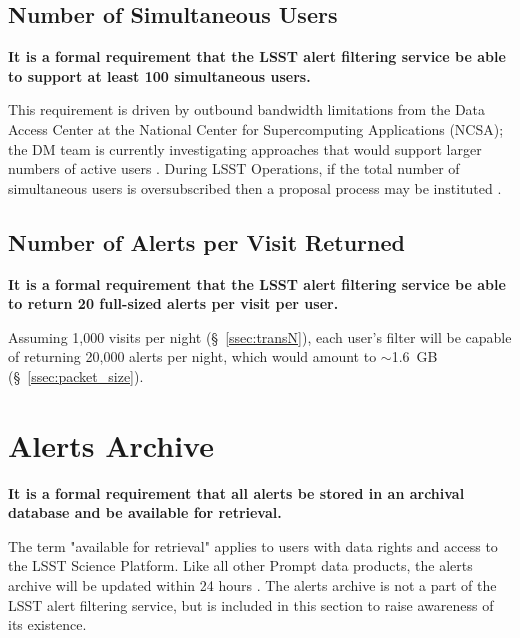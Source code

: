 \documentclass[DM,lsstdraft,authoryear,toc]{lsstdoc}
\begin{document}
\subsection{Number of Simultaneous Users}\label{ssec:LAFS_users}

{\bf It is a formal requirement that the LSST alert filtering service be able to support at least 100 simultaneous users.}

This requirement is driven by outbound bandwidth limitations from the Data Access Center at the National Center for Supercomputing Applications (NCSA); the DM team is currently investigating approaches that would support larger numbers of active users . During LSST Operations, if the total number of simultaneous users is oversubscribed then a proposal process may be instituted .


\subsection{Number of Alerts per Visit Returned}\label{ssec:LAFS_returns}

{\bf It is a formal requirement that the LSST alert filtering service be able to return 20 full-sized alerts per visit per user.}

Assuming 1,000 visits per night (\S~\ref{ssec:transN}), each user's filter will be capable of returning 20,000 alerts per night, which would amount to $\sim$1.6~GB (\S~\ref{ssec:packet_size}).


\section{Alerts Archive}\label{ssec:LAFS_adb}

{\bf It is a formal requirement that all alerts be stored in an archival database and be available for retrieval.}

The term "available for retrieval" applies to users with data rights and access to the LSST Science Platform. Like all other Prompt data products, the alerts archive will be updated within 24 hours . The alerts archive is not a part of the LSST alert filtering service, but is included in this section to raise awareness of its existence. 
\end{document}
